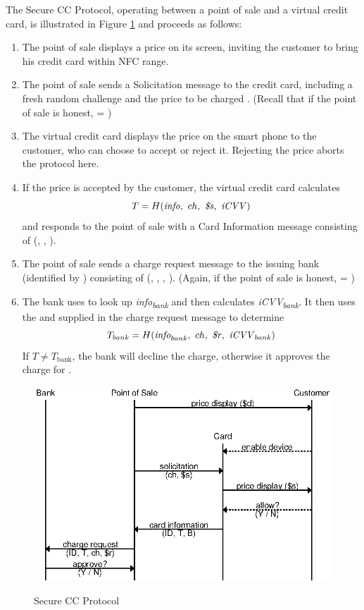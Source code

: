 The Secure CC Protocol, operating between a point of sale and a virtual credit card, is illustrated in Figure \ref{fig:secure-ccp} and proceeds as follows:

\begin{enumerate}
\item The point of sale displays a price  on its screen, inviting the customer to bring his credit card within NFC range.
\item The point of sale sends a Solicitation message to the credit card, including a fresh random challenge  and the price to be charged .
	(Recall that if the point of sale is honest,  = )
\item The virtual credit card displays the price  on the smart phone to the customer, who can choose to accept or reject it.
	Rejecting the price aborts the protocol here.
\item If the price is accepted by the customer, the virtual credit card calculates
    $$T = H(\textrm{\emph{info}},~ ch,~ \textrm{\emph{\$s}},~ \textrm{\emph{iCVV}})$$
	and responds to the point of sale with a Card Information message consisting of (, , ).
\item The point of sale sends a charge request message to the issuing bank (identified by ) consisting of (, , , ).
	(Again, if the point of sale is honest,  = )
\item The bank uses  to look up \emph{info\textsubscript{bank}} and then calculates \emph{iCVV\textsubscript{bank}}.
	It then uses the  and  supplied in the charge request message to determine
	$$T_{bank} = H(\textrm{\emph{info}}_{bank},~ ch,~ \textrm{\emph{\$r}},~ \textrm{\emph{iCVV}}_{bank})$$
	If $T \neq T_{\text{bank}}$, the bank will decline the charge, otherwise it approves the charge for .
\end{enumerate}

\begin{figure}
  \caption{Secure CC Protocol}
  \centering
    \includegraphics{img/secure_ccp.eps}
  \label{fig:secure-ccp}
\end{figure}

